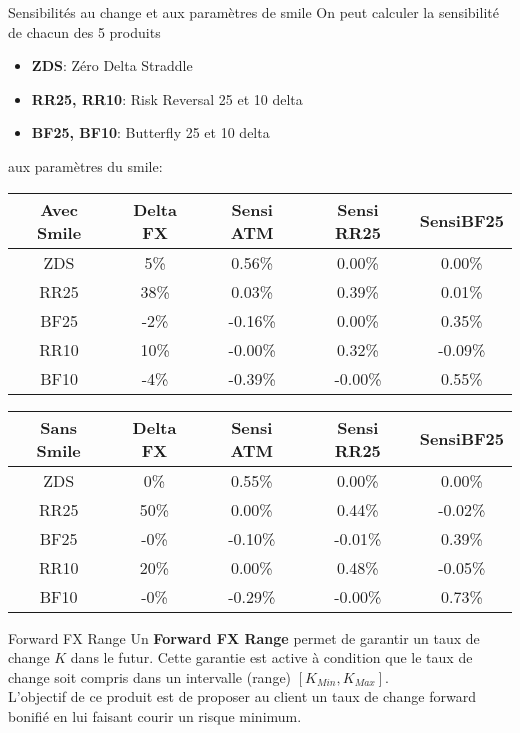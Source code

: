 \documentclass{beamer}
\begin{document}
\begin{frame}{Sensibilités au change et aux paramètres de smile}
On peut calculer la sensibilité de chacun des 5 produits 
\begin{itemize}
\item \textbf{ZDS}: Zéro Delta Straddle
\item \textbf{RR25, RR10}: Risk Reversal 25 et 10 delta
\item \textbf{BF25, BF10}: Butterfly 25 et 10 delta
\end{itemize}
aux paramètres du smile:\\
\begin{overprint}
\begin{center}
\begin{tabular}{|c|c|c|c|c|}
\hline
\textbf{Avec Smile}&\textbf{Delta FX}&\textbf{Sensi ATM}&\textbf{Sensi RR25}&\textbf{SensiBF25}\\
\hline
ZDS&5\%&0.56\%&0.00\%&0.00\%\\
RR25&38\%&0.03\%&0.39\%&0.01\%\\
BF25&-2\%&-0.16\%&0.00\%&0.35\%\\
RR10&10\%&-0.00\%&0.32\%&-0.09\%\\
BF10&-4\%&-0.39\%&-0.00\%&0.55\%\\
\hline
\end{tabular}
\end{center}
\begin{center}
\begin{tabular}{|c|c|c|c|c|}
\hline
\textbf{Sans Smile}&\textbf{Delta FX}&\textbf{Sensi ATM}&\textbf{Sensi RR25}&\textbf{SensiBF25}\\
\hline
ZDS&0\%&0.55\%&0.00\%&0.00\%\\
RR25&50\%&0.00\%&0.44\%&-0.02\%\\
BF25&-0\%&-0.10\%&-0.01\%&0.39\%\\
RR10&20\%&0.00\%&0.48\%&-0.05\%\\
BF10&-0\%&-0.29\%&-0.00\%&0.73\%\\
\hline
\end{tabular}
\end{center}
\end{overprint}
\end{frame}

\begin{frame}{Forward FX Range}
Un \textbf{Forward FX Range} permet de garantir un taux de change $K$ dans le futur. Cette garantie est active à condition que le taux de change soit compris dans un intervalle (range) $[K_{Min},K_{Max}]$.\\
\vspace{0.5 cm}
L'objectif de ce produit est de proposer au client un taux de change forward bonifié en lui faisant courir un risque minimum.
\end{frame}
\end{document}
